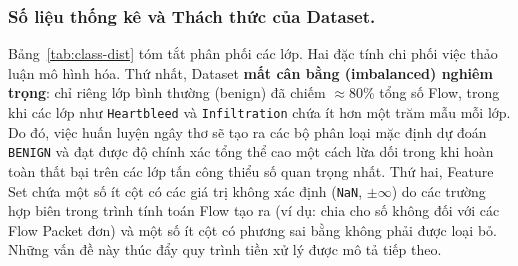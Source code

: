 \subsubsection*{Số liệu thống kê và Thách thức của Dataset.}
Bảng~\ref{tab:class-dist} tóm tắt phân phối các lớp. Hai đặc tính chi phối việc thảo luận mô hình hóa. Thứ nhất, Dataset \textbf{mất cân bằng (imbalanced) nghiêm trọng}: chỉ riêng lớp bình thường (benign) đã chiếm $\approx 80\%$ tổng số Flow, trong khi các lớp như \texttt{Heartbleed} và \texttt{Infiltration} chứa ít hơn một trăm mẫu mỗi lớp. Do đó, việc huấn luyện ngây thơ sẽ tạo ra các bộ phân loại mặc định dự đoán \texttt{BENIGN} và đạt được độ chính xác tổng thể cao một cách lừa dối trong khi hoàn toàn thất bại trên các lớp tấn công thiểu số quan trọng nhất. Thứ hai, Feature Set chứa một số ít cột có các giá trị không xác định (\texttt{NaN}, $\pm\infty$) do các trường hợp biên trong trình tính toán Flow tạo ra (ví dụ: chia cho số không đối với các Flow Packet đơn) và một số ít cột có phương sai bằng không phải được loại bỏ. Những vấn đề này thúc đẩy quy trình tiền xử lý được mô tả tiếp theo.
